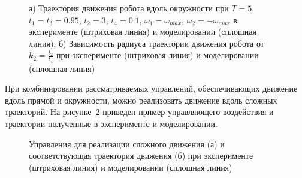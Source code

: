 \begin{figure}[!ht]
	\begin{minipage}[h]{0.5\linewidth}
	\end{minipage}
	\hfill
	\begin{minipage}[h]{0.5\linewidth}
	\end{minipage}
	\caption{а) Траектория движения робота вдоль окружности при $T = 5$, $t_1 = t_3 = 0.95$, $t_2 = 3$, $t_4 = 0.1$, $\omega_1 = \omega_{max}$, $\omega_2 = -\omega_{max}$ в эксперименте (штриховая линия) и моделировании (сплошная линия), б) Зависимость радиуса траектории движения робота от $k_2 = \frac{t_2}{t_4}$ при эксперименте (штриховая линия) и моделировании (сплошная линия)}
	\label{ControlActionOur}
\end{figure}




При комбинировании рассматриваемых управлений, обеспечивающих движение вдоль прямой и окружности, можно реализовать движение вдоль сложных траекторий. На рисунке~\ref{Slalom} приведен пример управляющего воздействия и траектории полученные в эксперименте и моделировании.

\begin{figure}[!ht]
	\begin{minipage}[h]{0.5\linewidth}
	\end{minipage}
	\hfill
	\begin{minipage}[h]{0.5\linewidth}
	\end{minipage}
	\caption{Управления для реализации сложного движения (а) и соответствующая траектория движения (б)  при эксперименте (штриховая линия) и моделировании (сплошная линия)}
	\label{Slalom}
\end{figure}

